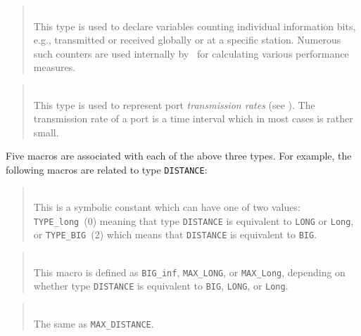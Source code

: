 \begin{quote}
\noindent{}\\ \hspace{0in}
This type is used to declare variables counting individual information
bits, e.g., transmitted or received globally or at a specific station.
Numerous such counters are used internally by \smurph\ for calculating
various performance measures.
\end{quote}

\begin{quote}
\noindent{}\\ \hspace{0in}
This type is used to represent port {\em transmission rates\/}
(see ).
The transmission rate of a port is a time interval which in most cases
is rather small.
\end{quote}\medskip

Five macros are associated with each of the above three types.
For example, the following macros are related to type {\tt DISTANCE}:

\medskip

\begin{quote}
\noindent{}\\ \hspace{0in}
This is a symbolic constant which
can have one of two values: {\tt TYPE\_long}~(0) meaning that type
{\tt DISTANCE} is equivalent to {\tt LONG} or {\tt Long},
or {\tt TYPE\_BIG}~(2) which
means that {\tt DISTANCE} is equivalent to {\tt BIG}.
\end{quote}

\begin{quote}
\noindent{}\\ \hspace{0in}
This macro is defined as {\tt BIG\_inf}, {\tt MAX\_LONG}, or
{\tt MAX\_Long}, depending on whether 
type {\tt DISTANCE} is equivalent to {\tt BIG}, {\tt LONG}, or {\tt Long}.
\end{quote}

\begin{quote}
\noindent{}\\ \hspace{0in}
The same as {\tt MAX\_DISTANCE}.
\end{quote}

